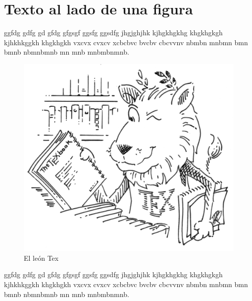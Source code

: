 \documentclass[a4paper,11pt]{article}
\begin{document}
	
	\begin{minipage}{0.99\textwidth}
	
	\section{Texto al lado de una figura}
	ggfdg gdfg gd gfdg gfgsgf ggsfg ggsdfg jhgjghjhk kjhgkhgkhg khgkhgkgh kjhkhkggkh khgkhgkh vxcvx cvxcv xcbcbvc bvcbv cbcvvnv nbmbn mnbmn bmn bmnb nbmnbmnb mn mnb mnbmbnmnb.
	\begin{figure}
		\vspace{-5mm}
		\includegraphics[width=0.8\linewidth]{tex_lion}
		\caption{El león Tex}
		\label{fig:leontex1}
	\end{figure}
	ggfdg gdfg gd gfdg gfgsgf ggsfg ggsdfg jhgjghjhk kjhgkhgkhg khgkhgkgh kjhkhkggkh khgkhgkh vxcvx cvxcv xcbcbvc bvcbv cbcvvnv nbmbn mnbmn bmn bmnb nbmnbmnb mn mnb mnbmbnmnb.
	

\end{minipage}
\end{document}
